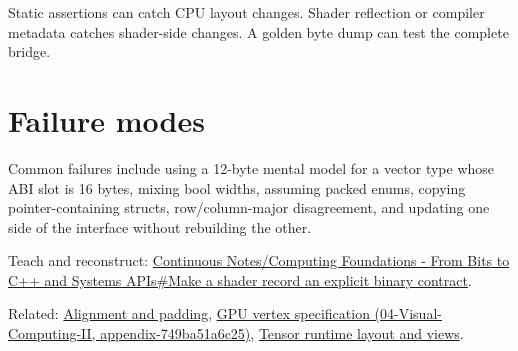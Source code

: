 Static assertions can catch CPU layout changes. Shader reflection or compiler metadata catches shader-side changes. A golden byte dump can test the complete bridge.

\section{Failure modes}\label{appendix-749048795dbb-failure-modes}

Common failures include using a 12-byte mental model for a vector type whose ABI slot is 16 bytes, mixing bool widths, assuming packed enums, copying pointer-containing structs, row/column-major disagreement, and updating one side of the interface without rebuilding the other.

Teach and reconstruct: \href{Continuous\%20Notes/Computing\%20Foundations\%20-\%20From\%20Bits\%20to\%20C++\%20and\%20Systems\%20APIs\#Make\%20a\%20shader\%20record\%20an\%20explicit\%20binary\%20contract}{Continuous Notes/Computing Foundations - From Bits to C++ and Systems APIs\#Make a shader record an explicit binary contract}.

Related: \hyperref[appendix-a1f7c53b4742]{Alignment and padding}, \href{../04-Visual-Computing-II/main.pdf\#nameddest=appendix-749ba51a6c25}{GPU vertex specification (04-Visual-Computing-II, appendix-749ba51a6c25)}, \hyperref[appendix-cebadf3106d1]{Tensor runtime layout and views}.
